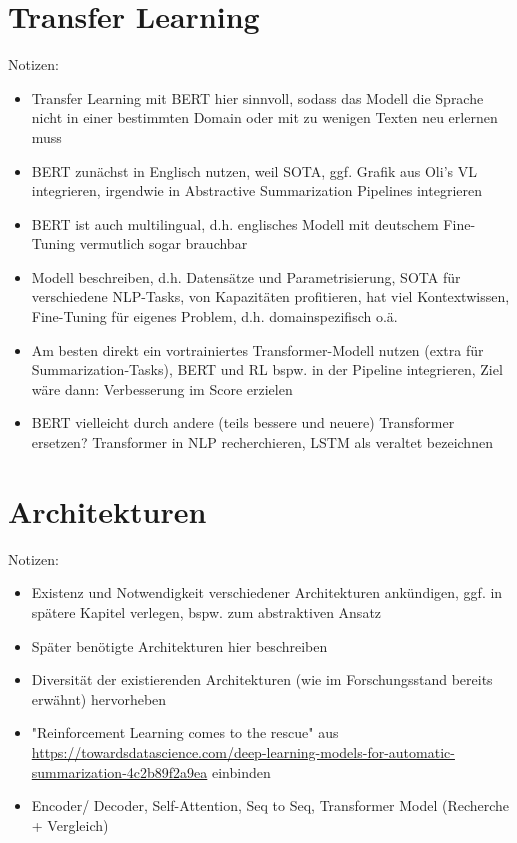 \section{Transfer Learning}
Notizen:
\begin{itemize}
	\item Transfer Learning mit BERT hier sinnvoll, sodass das Modell die Sprache nicht in einer bestimmten Domain oder mit zu wenigen Texten neu erlernen muss
	\item BERT zunächst in Englisch nutzen, weil SOTA, ggf. Grafik aus Oli's VL integrieren, irgendwie in Abstractive Summarization Pipelines integrieren
	\item BERT ist auch multilingual, d.h. englisches Modell mit deutschem Fine-Tuning vermutlich sogar brauchbar
	\item Modell beschreiben, d.h. Datensätze und Parametrisierung, SOTA für verschiedene NLP-Tasks, von Kapazitäten profitieren, hat viel Kontextwissen, Fine-Tuning für eigenes Problem, d.h. domainspezifisch o.ä.
	\item Am besten direkt ein vortrainiertes Transformer-Modell nutzen (extra für Summarization-Tasks), BERT und RL bspw. in der Pipeline integrieren, Ziel wäre dann: Verbesserung im Score erzielen
	\item BERT vielleicht durch andere (teils bessere und neuere) Transformer ersetzen? Transformer in NLP recherchieren, LSTM als veraltet bezeichnen
\end{itemize}


\section{Architekturen}
Notizen:
\begin{itemize}
	\item Existenz und Notwendigkeit verschiedener Architekturen ankündigen, ggf. in spätere Kapitel verlegen, bspw. zum abstraktiven Ansatz
	\item Später benötigte Architekturen hier beschreiben
	\item Diversität der existierenden Architekturen (wie im Forschungsstand bereits erwähnt) hervorheben
	\item "Reinforcement Learning comes to the rescue" aus \url{https://towardsdatascience.com/deep-learning-models-for-automatic-summarization-4c2b89f2a9ea} einbinden
	\item Encoder/ Decoder, Self-Attention, Seq to Seq, Transformer Model (Recherche + Vergleich)
\end{itemize}


